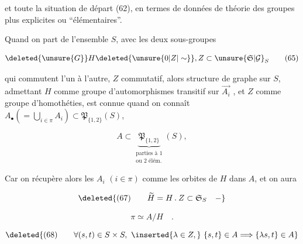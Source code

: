 et toute la situation de départ (62), en termes de  données de théorie des groupes plus explicites ou \textquotedblleft{}élémentaires\textquotedblright.

Quand on part de l'ensemble $S$, avec les deux sous-groupes

\[
\deleted{\unsure{G}}H\deleted{\unsure{0|Z|\sim}},Z\subset\unsure{\mathfrak S|\mathcal G}_S
\tag*{(65)}
\]

qui commutent l'un à l'autre, $Z$ commutatif, alors   structure de graphe  sur $S$, admettant $H$ comme groupe d'automorphismes transitif  sur  $\overrightarrow{A_i}$ , et $Z$ comme groupe d'homothéties, est connue quand on connaît  $A_{\bullet}(=\bigcup_{i\in\pi}A_i)\subset\mathfrak P_{\{1,2\}}(S)$,

\[
A\subset\underbrace{\mathfrak P_{\{1,2\}}}_{\substack{\text{parties à }1\\\text{ou }2\text{ élém.}}}(S),
\tag*{(66)}
\]

 Car on récupère alors les $A_i$ $(i\in\pi)$ comme  les orbites de $H$ dans $A$, et on aura

\[
\deleted{(67)\qquad\widetilde H=H\mathbin{.} Z\subset\mathfrak S_S\quad -}
\]

\[
\pi\simeq A/H\quad .
\tag*{(67.)}
\]

 


\[
\deleted{(68)\qquad\forall(s,t)\in S\times S,\ \inserted{\lambda\in Z,}\ \{s,t\}\in A\Longrightarrow\{\lambda s,t\}\in A}
\]



